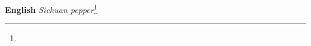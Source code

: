 \begin{etymology}\label{ety:Sichuan pepper}
\textbf{English} \textit{Sichuan pepper}\footnote{}
\end{etymology}